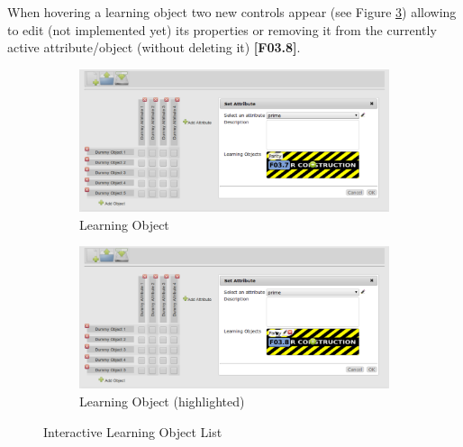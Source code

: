\documentclass[a4paper,11pt]{article}
\begin{document}
When hovering a learning object two new controls appear (see Figure \ref{fig:fca-attr-lo-hover}) allowing to edit (not implemented yet) its properties or removing it from the currently active attribute/object (without deleting it) \textbf{[F03.8]}.
\begin{figure}[h]
\begin{center}
  \begin{subfigure}{0.8 \textwidth}
    \begin{center}
    \includegraphics[width=\textwidth]{figures/attr_lo}
    \caption{Learning Object}
    \label{fig:fca-attr-lo}
    \end{center}
  \end{subfigure}
  \begin{subfigure}{0.8 \textwidth}
    \begin{center}
    \includegraphics[width=\textwidth]{figures/attr_lo_hov}
    \caption{Learning Object (highlighted)}
    \label{fig:fca-attr-lo-hover}
    \end{center}
  \end{subfigure}
\end{center}
\caption{Interactive Learning Object List}
\end{figure}

\FloatBarrier
\end{document}
